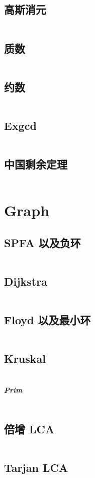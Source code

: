 \documentclass[titlepage, a4paper]{article}
\begin{document}
\begin{multicols}{2}
\begin{spacing}{0.6}
			 	\subsection{高斯消元}
			 		\inputminted{cpp}{src/Math/Gauss_cut.cpp}
			 	\subsection{质数}
			 		\inputminted{cpp}{src/Math/Primes.cpp}
			 	\subsection{约数}
			 		\inputminted{cpp}{src/Math/Factors.cpp}
			 	\subsection{Exgcd}
			 		\inputminted{cpp}{src/Math/Ex_gcd.cpp}
			 	\subsection{中国剩余定理}
			 		\inputminted{cpp}{src/Math/Crt.cpp}
			 \section{Graph}
			 	\subsection{SPFA 以及负环}
			 		\inputminted{cpp}{src/Graph/Spfa.cpp}
			 	\subsection{Dijkstra}
			 		\inputminted{cpp}{src/Graph/Dijkstra.cpp}
			 	\subsection{Floyd 以及最小环}
			 		\inputminted{cpp}{src/Graph/Floyd.cpp}
			 	\subsection{Kruskal}
			 		\inputminted{cpp}{src/Graph/Kruskal.cpp}
			 	\subparagraph{Prim}
			 		\inputminted{cpp}{src/Graph/Prim.cpp}
			 	\subsection{倍增 LCA}
			 		\inputminted{cpp}{src/Graph/Multiper_lca.cpp}
			 	\subsection{Tarjan LCA}
			 		\inputminted{cpp}{src/Graph/Tarjan_Lca.cpp}

\end{spacing}
\end{multicols}
\end{document}
